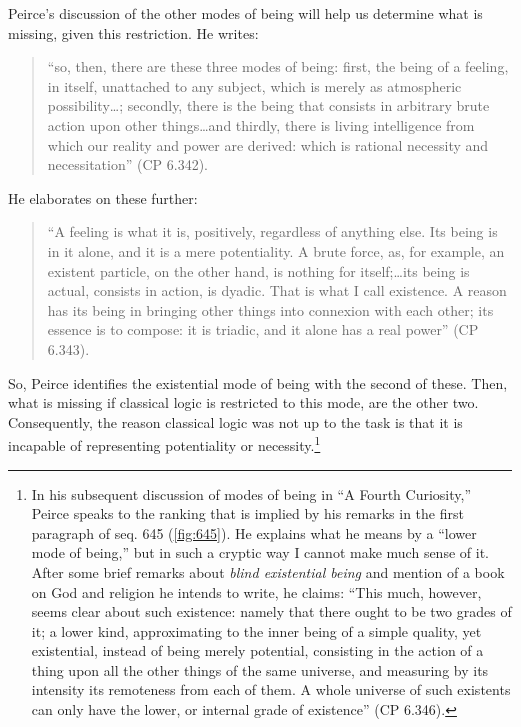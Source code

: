 Peirce's discussion of the other modes of being will help us determine what is missing, given this restriction. He writes: \begin{quotation} \noindent``so, then, there are these three modes of being: first, the being of a feeling, in itself, unattached to any subject, which is merely as atmospheric possibility\dots; secondly, there is the being that consists in arbitrary brute action upon other things\dots and thirdly, there is living intelligence from which our reality and power are derived: which is rational necessity and necessitation'' (CP 6.342).\end{quotation} He elaborates on these further: \begin{quotation}\noindent``A feeling is what it is, positively, regardless of anything else. Its being is in it alone, and it is a mere potentiality. A brute force, as, for example, an existent particle, on the other hand, is nothing for itself;\dots its being is actual, consists in action, is dyadic. That is what I call existence. A reason has its being in bringing other things into connexion with each other; its essence is to compose: it is triadic, and it alone has a real power'' (CP 6.343).\end{quotation} So, Peirce identifies the existential mode of being with the second of these. Then, what is missing if classical logic is restricted to this mode, are the other two. Consequently, the reason classical logic was not up to the task is that it is incapable of representing potentiality or necessity.\footnote{In his subsequent discussion of modes of being in ``A Fourth Curiosity,'' Peirce speaks to the ranking that is implied by his remarks in the first paragraph of seq. 645 (\ref{fig:645}). He explains what he means by a ``lower mode of being,'' but in such a cryptic way I cannot make much sense of it. After some brief remarks about \textit{blind existential being} and mention of a book on God and religion he intends to write, he claims: ``This much, however, seems clear about such existence: namely that there ought to be two grades of it; a lower kind, approximating to the inner being of a simple quality, yet existential, instead of being merely potential, consisting in the action of a thing upon all the other things of the same universe, and measuring by its intensity its remoteness from each of them. A whole universe of such existents can only have the lower, or internal grade of existence'' (CP 6.346).} 

